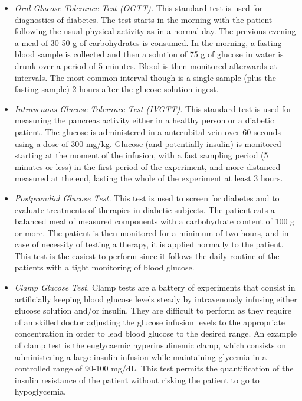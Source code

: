 \begin{itemize}
	\item \emph{Oral Glucose Tolerance Test (OGTT).} This standard test is used for diagnostics of diabetes. The test starts in the morning with the patient following the usual physical activity as in a normal day. The previous evening a meal of 30-50 g of carbohydrates is consumed. In the morning, a fasting blood sample is collected and then a solution of 75 g of glucose in water is drunk over a period of 5 minutes. Blood is then monitored afterwards at intervals. The most common interval though is a single sample (plus the fasting sample) 2 hours after the glucose solution ingest.
	\item \emph{Intravenous Glucose Tolerance Test (IVGTT).} This standard test is used for measuring the pancreas activity either in a healthy person or a diabetic patient. The glucose is administered in a antecubital vein over 60 seconds using a dose of 300 mg/kg. Glucose (and potentially insulin) is monitored starting at the moment of the infusion, with a fast sampling period (5 minutes or less) in the first period of the experiment, and more distanced measured at the end, lasting the whole of the experiment at least 3 hours.
	\item \emph{Postprandial Glucose Test.} This test is used to screen for diabetes and to evaluate treatments of therapies in diabetic subjects. The patient eats a balanced meal of measured components with a carbohydrate content of 100 g or more. The patient is then monitored for a minimum of two hours, and in case of necessity of testing a therapy, it is applied normally to the patient. This test is the easiest to perform since it follows the daily routine of the patients with a tight monitoring of blood glucose.
	\item \emph{Clamp Glucose Test.} Clamp tests are a battery of experiments that consist in artificially keeping blood glucose levels steady by intravenously infusing either glucose solution and/or insulin. They are difficult to perform as they require of an skilled doctor adjusting the glucose infusion levels to the appropriate concentration in order to lead blood glucose to the desired range. An example of clamp test is the euglycaemic hyperinsulinemic clamp, which consists on administering a large insulin infusion while maintaining glycemia in a controlled range of 90-100 mg/dL. This test permits the quantification of the insulin resistance of the patient without risking the patient to go to hypoglycemia.
\end{itemize}

